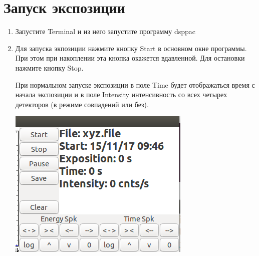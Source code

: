 \documentclass[]{article}
\begin{document}
\section{Запуск экспозиции}

\begin{enumerate}
\def\labelenumi{\arabic{enumi}.}
\item
  Запустите Terminal и из него запустите программу dsppac
\item
  Для запуска экпозиции нажмите кнопку Start в основном окне программы.
  При этом при накоплении эта кнопка окажется вдавленной. Для остановки
  нажмите кнопку Stop.

  При нормальном запуске экспозиции в поле Time будет отображаться время
  с начала экспозиции и в поле Intensity интенсивность со всех четырех
  детекторов (в режиме совпадений или без).

  \includegraphics{./imgs/start_exposition_Btns_Info_field.png}
\end{enumerate}
\end{document}
